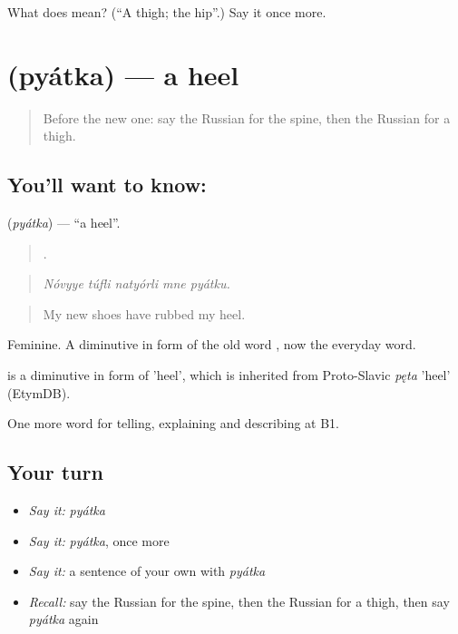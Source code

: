 \begin{tcolorbox}[breakable,colback=teal!4,colframe=teal!35!black,title={Before you move on}]
What does  mean? (\textquotedblleft{}A thigh; the hip\textquotedblright{}.) Say it once more.
\end{tcolorbox}
\section[\texorpdfstring{\ru{пятка} (pyátka)}{пятка (pyátka)}]{ (pyátka) — a heel}

\label{lesson:RU-C481-pyatka}



\begin{quote}
Before the new one: say the Russian for the spine, then the Russian for a thigh.
\end{quote}

\subsection*{You'll want to know: }
\textbf{} (\emph{pyátka}) — \textquotedblleft{}a heel\textquotedblright{}.

\begin{quote}
    .
\end{quote}

\begin{quote}
\emph{Nóvyye túfli natyórli mne pyátku.}
\end{quote}

\begin{quote}
My new shoes have rubbed my heel.
\end{quote}

Feminine. A diminutive in form of the old word \emph{}, now the everyday word.

\begin{cousinweb}
\emph{} is a diminutive in form of \emph{} 'heel', which is inherited from Proto-Slavic \emph{pęta} 'heel' (EtymDB).
\end{cousinweb}

\begin{grammarlens}[title={What you've built}]
One more word for telling, explaining and describing at B1.
\end{grammarlens}

\subsection*{Your turn}
\begin{itemize}
\raggedright
  \item \emph{Say it:} \emph{pyátka}
  \item \emph{Say it:} \emph{pyátka}, once more
  \item \emph{Say it:} a sentence of your own with \emph{pyátka}
  \item \emph{Recall:} say the Russian for the spine, then the Russian for a thigh, then say \emph{pyátka} again
\end{itemize}

